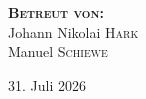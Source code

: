 \begin{titlepage}
\textsc{\large \textbf{Betreut von:} }\\[0.2cm] %

\Large Johann Nikolai \textsc{Hark} \\[0.1cm]

\Large Manuel \textsc{Schiewe} \\[0.6cm]


\vfill %

{\large 31. Juli 2026} %

\end{titlepage}
